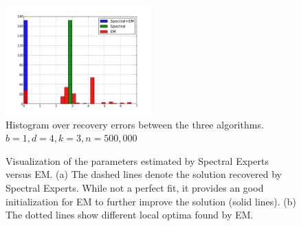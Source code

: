 \begin{figure}[h]
  \centering
  \includegraphics[width=0.50\textwidth]{figures/hist.pdf}
  \caption{Histogram over recovery errors between the three algorithms. $b = 1, d = 4, k = 3, n = 500,000$}
  \label{fig:hist}
\end{figure}


\begin{figure}[p]
  \centering
    \hspace{-2em}
  \caption{Visualization of the parameters estimated by Spectral Experts versus EM.
  (a) The dashed lines denote the solution recovered by Spectral Experts. While
  not a perfect fit, it provides an good initialization for EM to further improve the solution (solid lines).
  (b) The dotted lines show different local optima found by EM.}
  \label{fig:curves}
\end{figure}

